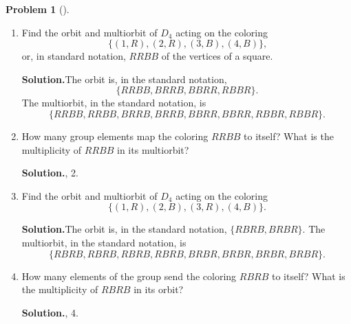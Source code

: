 \documentclass[10pt,]{book}
\theoremstyle{plain}
\theoremstyle{definition}
\newtheorem{activity}[project]{Problem}
\theoremstyle{definition}
\numberwithin{equation}{chapter}
\begin{document}
\begin{activity}[]\label{activity-291}
\leavevmode%
\begin{enumerate}[font=\bfseries,label=(\alph*),ref=\alph*]
\item\label{task-215} Find the orbit and multiorbit of \(D_4\) acting on the coloring%
\begin{equation*}
\{(1,R),(2,R),(3,B),(4,B)\}\text{,}
\end{equation*}
or, in standard notation, \(RRBB\) of the vertices of a square.%
\par\medskip\noindent%
\textbf{Solution.}\quad The orbit is, in the standard notation,%
\begin{equation*}
\{RRBB,BRRB,BBRR,RBBR\}\text{.}
\end{equation*}
The multiorbit, in the standard notation, is%
\begin{equation*}
\{RRBB,RRBB,BRRB,BRRB,BBRR,BBRR,RBBR,RBBR\}\text{.}
\end{equation*}
%
\item\label{task-216} How many group elements map the coloring \(RRBB\) to itself? What is the multiplicity of \(RRBB\) in its multiorbit?%
\par\medskip\noindent%
\textbf{Solution.}, 2.%
\item\label{task-217} Find the orbit and multiorbit of \(D_4\) acting on the coloring%
\begin{equation*}
\{(1,R),(2,B),(3,R),(4,B)\}\text{.}
\end{equation*}
%
\par\medskip\noindent%
\textbf{Solution.}\quad The orbit is, in the standard notation, \(\{RBRB,BRBR\}\). The multiorbit, in the standard notation, is%
\begin{equation*}
\{RBRB,RBRB,RBRB,RBRB,BRBR,BRBR,BRBR,BRBR\}\text{.}
\end{equation*}
%
\item\label{task-218} How many elements of the group send the coloring \(RBRB\) to itself? What is the multiplicity of \(RBRB\) in its orbit?%
\par\medskip\noindent%
\textbf{Solution.}, 4.%
\end{enumerate}
\end{activity}
\end{document}
